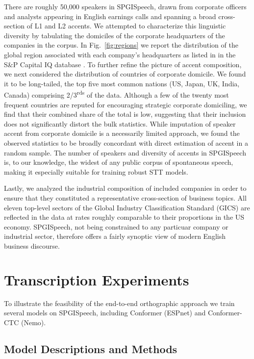 \documentclass{article}
\newcommand\figref{Fig.~\ref}
\newcommand{\corpus}{SPGISpeech}
\begin{document}
There are roughly 50,000 speakers in \corpus{}, drawn from corporate officers and analysts
appearing in English earnings calls and spanning a broad cross-section of
L1 and L2 accents.  We attempted to characterize this linguistic
diversity by tabulating the domiciles of the corporate headquarters of
the companies in the corpus.  In \figref{fig:regions} we report the distribution of the global region associated with each
company's headquarters as listed in in the S\&P Capital IQ database \cite{capiq12}.  To further refine the picture of accent
composition, we next considered the distribution of countries of
corporate domicile.  We found it to be long-tailed, the top five
most common nations (US, Japan, UK, India, Canada) comprising
2/3\textsuperscript{rds} of the data.  Although a few of the twenty
most frequent countries are reputed for encouraging strategic
corporate domiciling, we find that their combined share of the total
is low, suggesting that their inclusion does not significantly distort
the bulk statistics.  While imputation of speaker accent from
corporate domicile is a necessarily limited approach, we found the
observed statistics to be broadly concordant with direct estimation of
accent in a random sample.  The number of speakers and diversity of accents in \corpus{} is, to our knowledge, the widest of any public corpus of spontaneous speech, making it especially suitable for training robust STT models.

Lastly, we analyzed the industrial composition of included companies
in order to ensure that they constituted a representative
cross-section of business topics.  All eleven top-level sectors of the Global
Industry Classification Standard (GICS) \cite{gics19} are reflected in
the data at rates roughly comparable to their proportions in the US
economy.  SPGISpeech, not being constrained to any particuar company or industrial sector, therefore offers a fairly synoptic view of modern English business discourse. 



\section{Transcription Experiments}\label{sec:model}
To illustrate the feasibility of the end-to-end orthographic approach we train several models on SPGISpeech, including Conformer (ESPnet) and Conformer-CTC (Nemo).  

\subsection{Model Descriptions and Methods}
\end{document}
